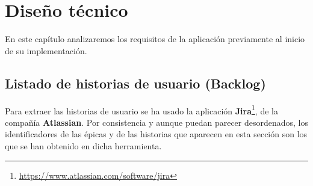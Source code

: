 \chapter{Diseño técnico}

En este capítulo analizaremos los requisitos de la aplicación previamente al inicio de su implementación.

\section{Listado de historias de usuario (Backlog)}

Para extraer las historias de usuario se ha usado la aplicación \textbf{Jira}\footnote{\url{https://www.atlassian.com/software/jira}}, de la compañía \textbf{Atlassian}. Por consistencia y aunque puedan parecer desordenados, los identificadores de las épicas y de las historias que aparecen en esta sección son los que se han obtenido en dicha herramienta.

